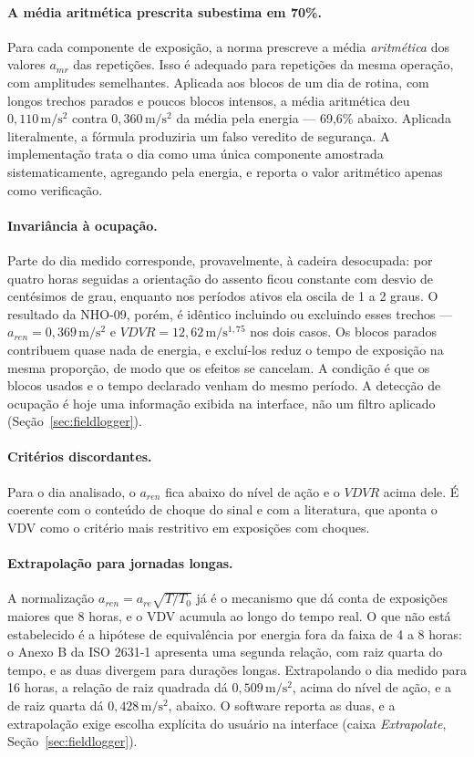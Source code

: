 \documentclass[11pt,a4paper]{article}
\newcommand{\unit}[2]{\ensuremath{#1\,\mathrm{#2}}}
\begin{document}
\paragraph{A média aritmética prescrita subestima em 70\%.} Para cada
componente de exposição, a norma prescreve a média \emph{aritmética} dos
valores $a_{mr}$ das repetições. Isso é adequado para repetições da mesma
operação, com amplitudes semelhantes. Aplicada aos blocos de um dia de rotina,
com longos trechos parados e poucos blocos intensos, a média aritmética deu
\unit{0{,}110}{m/s^2} contra \unit{0{,}360}{m/s^2} da média pela energia ---
69,6\% abaixo. Aplicada literalmente, a fórmula produziria um falso veredito de
segurança. A implementação trata o dia como uma única componente amostrada
sistematicamente, agregando pela energia, e reporta o valor aritmético apenas
como verificação.

\paragraph{Invariância à ocupação.} Parte do dia medido corresponde,
provavelmente, à cadeira desocupada: por quatro horas seguidas a orientação do
assento ficou constante com desvio de centésimos de grau, enquanto nos períodos
ativos ela oscila de 1 a 2 graus. O resultado da NHO-09, porém, é idêntico
incluindo ou excluindo esses trechos --- $a_{ren} = \unit{0{,}369}{m/s^2}$ e
$VDVR = \unit{12{,}62}{m/s^{1{,}75}}$ nos dois casos. Os blocos parados
contribuem quase nada de energia, e excluí-los reduz o tempo de exposição na
mesma proporção, de modo que os efeitos se cancelam. A condição é que os blocos
usados e o tempo declarado venham do mesmo período. A detecção de ocupação é
hoje uma informação exibida na interface, não um filtro aplicado
(Seção~\ref{sec:fieldlogger}).

\paragraph{Critérios discordantes.} Para o dia analisado, o $a_{ren}$ fica
abaixo do nível de ação e o $VDVR$ acima dele. É coerente com o conteúdo de
choque do sinal e com a literatura, que aponta o VDV como o critério mais
restritivo em exposições com choques.

\paragraph{Extrapolação para jornadas longas.} A normalização
$a_{ren} = a_{re}\sqrt{T/T_0}$ já é o mecanismo que dá conta de exposições
maiores que 8 horas, e o VDV acumula ao longo do tempo real. O que não está
estabelecido é a hipótese de equivalência por energia fora da faixa de 4 a 8
horas: o Anexo B da ISO 2631-1 apresenta uma segunda relação, com raiz quarta
do tempo, e as duas divergem para durações longas. Extrapolando o dia medido
para 16 horas, a relação de raiz quadrada dá \unit{0{,}509}{m/s^2}, acima do
nível de ação, e a de raiz quarta dá \unit{0{,}428}{m/s^2}, abaixo. O software
reporta as duas, e a extrapolação exige escolha explícita do usuário na
interface (caixa \emph{Extrapolate}, Seção~\ref{sec:fieldlogger}).
\end{document}
